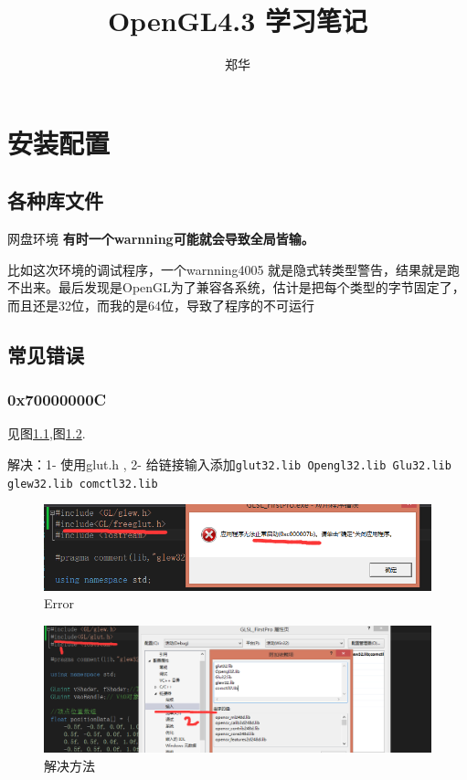 \documentclass[UTF8,a4paper,8pt]{ctexbook}
\author{\kaishu 郑华}
\title{\heiti OpenGL4.3  学习笔记}
\begin{document}
 	\maketitle
 
	\newpage
	\tableofcontents
	
\newpage
\chapter{安装配置}
    \section{各种库文件}网盘环境
    \textbf{有时一个warnning可能就会导致全局皆输。}
    
    比如这次环境的调试程序，一个warnning4005  就是隐式转类型警告，结果就是跑不出来。最后发现是OpenGL为了兼容各系统，估计是把每个类型的字节固定了，而且还是32位，而我的是64位，导致了程序的不可运行
    
    \section{常见错误}
	    \subsection{0x70000000C}见图\ref{Glut Error},图\ref{Glut_fix}.
	    
		    解决：1- 使用glut.h , 2- 给链接输入添加\verb|glut32.lib Opengl32.lib Glu32.lib glew32.lib comctl32.lib|
		    \begin{figure}[h]
		    	\begin{center}
					\includegraphics[scale = 0.5]{glutDoesNotMatchError.png}%
		    		\caption{Error}
		    		\label{Glut Error}
		    	\end{center}
		    \end{figure}
		    \begin{figure}[h]
		    	\centering
		    	\includegraphics[scale = 0.4]{glutMatch.png}
		    	\caption{解决方法}
		    	\label{Glut_fix}
		    \end{figure}
\end{document}
